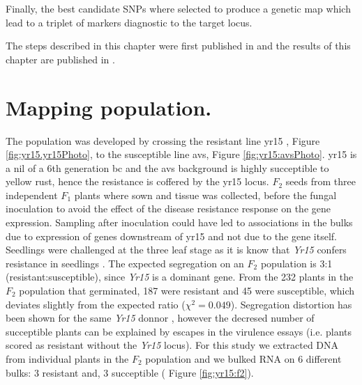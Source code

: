 Finally, the best candidate SNPs where selected to produce a genetic map which lead to a triplet of markers diagnostic to the target locus. 

The steps described in this chapter were first published in \citet{Ramirez-Gonzalez2015c} and the results of this chapter are published in \citet{Ramirez-Gonzalez2015b}.

\section{Mapping population.}

The population was developed by crossing the resistant line \gls{yr15} \citep{Wellings1998}, Figure \ref{fig:yr15.yr15Photo}, to the susceptible line \gls{avs}, Figure \ref{fig:yr15:avsPhoto}. 
\gls{yr15} is a \gls{nil} of a 6th generation \gls{bc} and the \gls{avs} background is highly succeptible to yellow rust, hence the resistance is coffered by the \gls{yr15} locus. 
$F_{2}$ seeds from three independent $F_{1}$ plants where sown and tissue was collected, before the fungal inoculation to avoid the effect of the disease resistance response on the gene expression. 
Sampling after inoculation could have led to associations in the bulks due to expression of genes downstream of \gls{yr15} and not due to the gene itself.
Seedlings were challenged at the three leaf stage as it is know that \textit{Yr15} confers resistance in seedlings \citep{Gerechter-Amitai1989}.
The expected segregation on an $F_{2}$ population is 3:1 (resistant:susceptible), since \textit{Yr15} is a dominant gene.
From the 232 plants in the $F_{2}$ population that germinated, 187 were resistant and 45 were susceptible, which deviates slightly from the expected ratio ($\chi^{2}=0.049$).
Segregation distortion has been shown for the same \textit{Yr15} donnor \citep{Randhawa2009}, however the decresed number of succeptible plants can be explained by escapes in the virulence essays (i.e. plants scored as resistant without the \textit{Yr15} locus).   For this study we extracted DNA from individual plants in the $F_{2}$ population and we bulked RNA on 6 different bulks: 3 resistant and, 3 succeptible ( Figure \ref{fig:yr15:f2}). 


